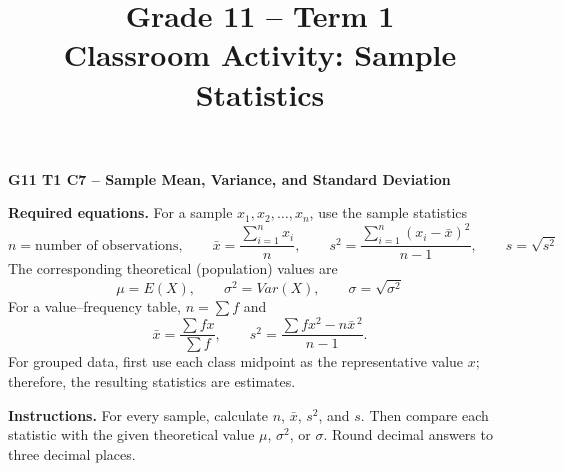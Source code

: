 \makeatletter
{}
\makeatother



\title{Grade 11 -- Term 1 \\ Classroom Activity: Sample Statistics}
\author{}
\date{}

\pagestyle{empty}


\newcommand{\SolutionStage}[2]{%
	\Needspace{6\baselineskip}%
	\subsection{#2}%
}





\vspace*{-15mm}

\begin{center}
	{\large\bfseries G11 T1 C7 -- Sample Mean, Variance, and Standard Deviation}
\end{center}

\vspace{-3mm}

\noindent
\textbf{Required equations.}
For a sample $x_1,x_2,\ldots,x_n$, use the sample statistics
\[
\boxed{
	n=\text{number of observations},\qquad
	\bar{x}=\frac{\sum_{i=1}^{n}x_i}{n},\qquad
	s^2=\frac{\sum_{i=1}^{n}(x_i-\bar{x})^2}{n-1},\qquad
	s=\sqrt{s^2}
}
\]
The corresponding theoretical (population) values are
\[
\boxed{
	\mu=E(X),\qquad
	\sigma^2=Var(X),\qquad
	\sigma=\sqrt{\sigma^2}
}
\]
For a value--frequency table, $n=\sum f$ and
\[
	\bar{x}=\frac{\sum fx}{\sum f},
	\qquad
	s^2=\frac{\sum fx^2-n\bar{x}^{\,2}}{n-1}.
\]
For grouped data, first use each class midpoint as the representative value $x$;
therefore, the resulting statistics are estimates.

\medskip
\noindent
\textbf{Instructions.} For every sample, calculate $n$, $\bar{x}$, $s^2$, and
$s$. Then compare each statistic with the given theoretical value
$\mu$, $\sigma^2$, or $\sigma$. Round decimal answers to three decimal places.


